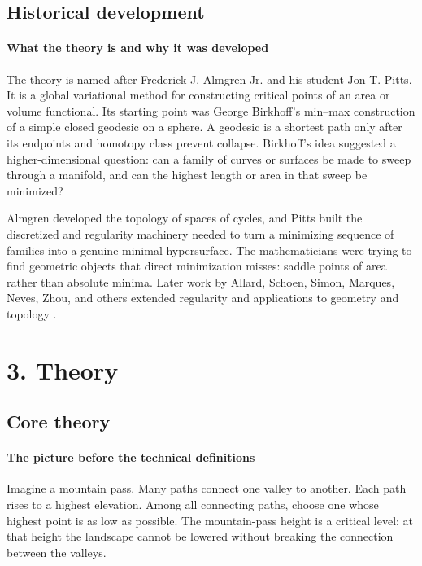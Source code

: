 \subsection*{Historical development}
\begin{historylist}
\paragraph{What the theory is and why it was developed}

The theory is named after Frederick J. Almgren Jr. and his student Jon T. Pitts. It is a global variational method for constructing critical points of an area or volume functional. Its starting point was George Birkhoff's min--max construction of a simple closed geodesic on a sphere. A geodesic is a shortest path only after its endpoints and homotopy class prevent collapse. Birkhoff's idea suggested a higher-dimensional question: can a family of curves or surfaces be made to sweep through a manifold, and can the highest length or area in that sweep be minimized?

Almgren developed the topology of spaces of cycles, and Pitts built the discretized and regularity machinery needed to turn a minimizing sequence of families into a genuine minimal hypersurface. The mathematicians were trying to find geometric objects that direct minimization misses: saddle points of area rather than absolute minima. Later work by Allard, Schoen, Simon, Marques, Neves, Zhou, and others extended regularity and applications to geometry and topology \cite{almgren_pitts_min_max_theory_ref1,almgren_pitts_min_max_theory_ref2,almgren_pitts_min_max_theory_ref3}.

\end{historylist}
\section*{3. Theory}
\subsection*{Core theory}
\paragraph{The picture before the technical definitions}

Imagine a mountain pass. Many paths connect one valley to another. Each path rises to a highest elevation. Among all connecting paths, choose one whose highest point is as low as possible. The mountain-pass height is a critical level: at that height the landscape cannot be lowered without breaking the connection between the valleys.


